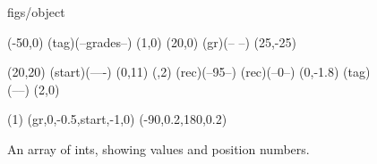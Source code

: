 





\begin {figure}


\Draw

 {figs/object}

\Move(-50,0)
\Node(tag)(--grades--)
\MoveToExit(1,0)
\Move(20,0)
\ORectNode(gr)(-- --)
\Move (25,-25)

\MinNodeSize(20,20)
\Node(start)(----)
\Do(0,11)
{  \IF \EqInt(\DoReg,2) \THEN
 	\RectNode(rec)(--95--)
   \ELSE
 	\RectNode(rec)(--0--)
   \FI
   { 	\MoveToExit(0,-1.8)
 	\Node(tag)(--\DoReg--)
   }
   \MoveToExit(2,0)
}
    
\ArrowHeads(1)
\CurvedEdgeAt(gr,0,-0.5,start,-1,0) (-90,0.2,180,0.2)
\EndDraw

\caption {An array of ints, showing values and position numbers.}

\label {fig:array}

\end {figure}


